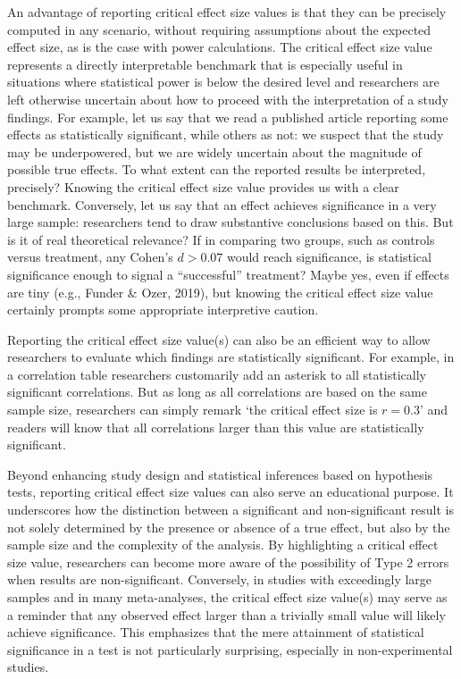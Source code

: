 \documentclass[
  man,floatsintext]{apa7}
\begin{document}
An advantage of reporting critical effect size values is that they can be precisely computed in any scenario, without requiring assumptions about the expected effect size, as is the case with power calculations. The critical effect size value represents a directly interpretable benchmark that is especially useful in situations where statistical power is below the desired level and researchers are left otherwise uncertain about how to proceed with the interpretation of a study findings. For example, let us say that we read a published article reporting some effects as statistically significant, while others as not: we suspect that the study may be underpowered, but we are widely uncertain about the magnitude of possible true effects. To what extent can the reported results be interpreted, precisely? Knowing the critical effect size value provides us with a clear benchmark. Conversely, let us say that an effect achieves significance in a very large sample: researchers tend to draw substantive conclusions based on this. But is it of real theoretical relevance? If in comparing two groups, such as controls versus treatment, any Cohen's \(d > 0.07\) would reach significance, is statistical significance enough to signal a ``successful'' treatment? Maybe yes, even if effects are tiny (e.g., Funder \& Ozer, 2019), but knowing the critical effect size value certainly prompts some appropriate interpretive caution.

Reporting the critical effect size value(s) can also be an efficient way to allow researchers to evaluate which findings are statistically significant. For example, in a correlation table researchers customarily add an asterisk to all statistically significant correlations. But as long as all correlations are based on the same sample size, researchers can simply remark `the critical effect size is \(r = 0.3\)' and readers will know that all correlations larger than this value are statistically significant.

Beyond enhancing study design and statistical inferences based on hypothesis tests, reporting critical effect size values can also serve an educational purpose. It underscores how the distinction between a significant and non-significant result is not solely determined by the presence or absence of a true effect, but also by the sample size and the complexity of the analysis. By highlighting a critical effect size value, researchers can become more aware of the possibility of Type 2 errors when results are non-significant. Conversely, in studies with exceedingly large samples and in many meta-analyses, the critical effect size value(s) may serve as a reminder that any observed effect larger than a trivially small value will likely achieve significance. This emphasizes that the mere attainment of statistical significance in a test is not particularly surprising, especially in non-experimental studies.
\end{document}

